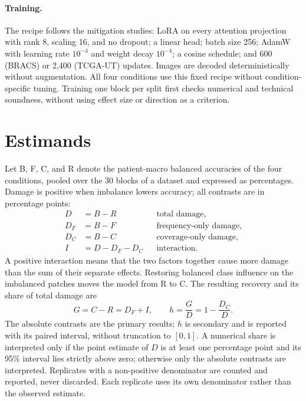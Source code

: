 \documentclass[11pt]{article}
\begin{document}
\paragraph{Training.} The recipe follows the mitigation studies: LoRA on every attention projection with rank 8, scaling 16, and no dropout; a linear head; batch size 256; AdamW with learning rate $10^{-4}$ and weight decay $10^{-4}$; a cosine schedule; and 600 (BRACS) or 2,400 (TCGA-UT) updates. Images are decoded deterministically without augmentation. All four conditions use this fixed recipe without condition-specific tuning. Training one block per split first checks numerical and technical soundness, without using effect size or direction as a criterion.

\section{Estimands}
\label{sec:estimands}
Let B, F, C, and R denote the patient-macro balanced accuracies of the four conditions, pooled over the 30 blocks of a dataset and expressed as percentages. Damage is positive when imbalance lowers accuracy; all contrasts are in percentage points:
\begin{align}
D &= B - R && \text{total damage,} \\
D_F &= B - F && \text{frequency-only damage,} \\
D_C &= B - C && \text{coverage-only damage,} \\
I &= D - D_F - D_C && \text{interaction.}
\end{align}
A positive interaction means that the two factors together cause more damage than the sum of their separate effects. Restoring balanced class influence on the imbalanced patches moves the model from R to C. The resulting recovery and its share of total damage are
\begin{equation}
G = C - R = D_F + I, \qquad h = \frac{G}{D} = 1 - \frac{D_C}{D}.
\label{eq:share}
\end{equation}
The absolute contrasts are the primary results; $h$ is secondary and is reported with its paired interval, without truncation to $[0,1]$. A numerical share is interpreted only if the point estimate of $D$ is at least one percentage point and its 95\% interval lies strictly above zero; otherwise only the absolute contrasts are interpreted. Replicates with a non-positive denominator are counted and reported, never discarded. Each replicate uses its own denominator rather than the observed estimate.
\end{document}

